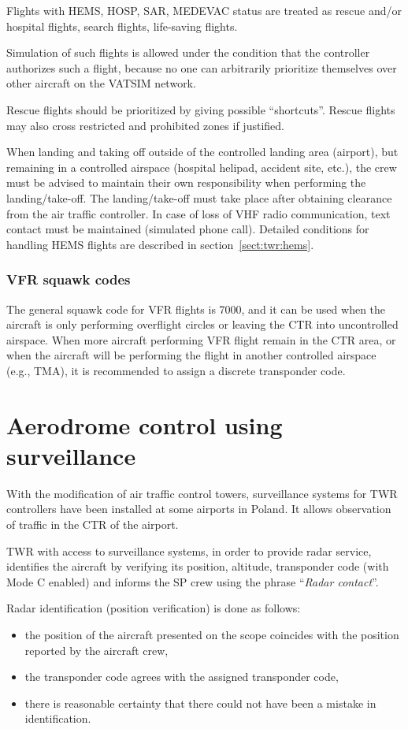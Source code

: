 Flights with HEMS, HOSP, SAR, MEDEVAC status are treated as rescue and/or hospital flights, search flights, life-saving flights.

Simulation of such flights is allowed under the condition that the controller authorizes such a flight, because no one can arbitrarily prioritize themselves over other aircraft on the VATSIM network.

Rescue flights should be prioritized by giving possible ``shortcuts''. Rescue flights may also cross restricted and prohibited zones if justified.

When landing and taking off outside of the controlled landing area (airport), but remaining in a controlled airspace (hospital helipad, accident site, etc.), the crew must be advised to maintain their own responsibility when performing the landing/take-off. The landing/take-off must take place after obtaining clearance from the air traffic controller.
In case of loss of VHF radio communication, text contact must be maintained (simulated phone call).
Detailed conditions for handling HEMS flights are described in section~\ref{sect:twr:hems}.

\subsubsection{VFR squawk codes}
The general squawk code for VFR flights is 7000, and it can be used when the aircraft is only performing overflight circles or leaving the CTR into uncontrolled airspace. When more aircraft performing VFR flight remain in the CTR area, or when the aircraft will be performing the flight in another controlled airspace (e.g., TMA), it is recommended to assign a discrete transponder code.

\section{Aerodrome control using surveillance}
With the modification of air traffic control towers, surveillance systems for TWR controllers have been installed at some airports in Poland. It allows observation of traffic in the CTR of the airport.

TWR with access to surveillance systems, in order to provide radar service, identifies the aircraft by verifying its position, altitude, transponder code (with Mode C enabled) and informs the SP crew using the phrase ``\emph{Radar contact}''.

Radar identification (position verification) is done as follows:
\begin{itemize}
	\item the position of the aircraft presented on the scope coincides with the position reported by the aircraft crew,
	\item the transponder code agrees with the assigned transponder code,
	\item there is reasonable certainty that there could not have been a mistake in identification.
\end{itemize}


